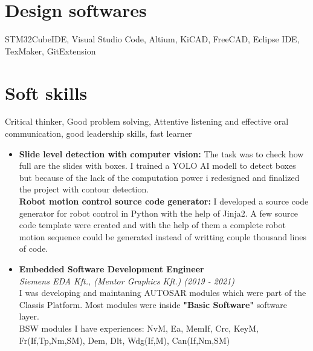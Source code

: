 \documentclass[11pt,oneslide,a4paper,titlepage]{article}
\begin{document}
\newpage
{}
\begin{tcolorbox}
	\begin{minipage}[t]{8cm}
		\vspace*{-0.5cm}
		\begin{tcolorbox}[grow to left by=0.6cm,colback=gray!25,colframe=white]
			\vspace*{0.5cm}
			\section*{Design softwares}
			\hfill\break
			STM32CubeIDE, Visual Studio Code, Altium, KiCAD, FreeCAD, 					Eclipse IDE, TexMaker, GitExtension	
			\section*{Soft skills}
		    Critical thinker, Good problem solving, Attentive listening and effective oral communication, good leadership skills, fast learner				
		\end{tcolorbox}
	\end{minipage}
	\begin{minipage}[t]{11cm}
		\vspace*{0.5cm}
		\begin{tcolorbox}[grow to right by=0.75cm,colframe=white,colback=white]
			\begin{itemize}
			\item[]{
				\textbf{Slide level detection with computer vision:} The task was to check how full are the slides with boxes. I trained a YOLO AI modell to detect boxes but because of the lack of the computation power i redesigned and finalized the project with contour detection. \\ 

				\textbf{Robot motion control source code generator:}
I developed a source code generator for robot control in Python with the help of Jinja2.
A few source code template were created and with the help of them a complete robot motion sequence could be generated instead of writting couple thousand lines of code.
			}
			\end{itemize}
			
			\begin{itemize}
				\item{
					\textbf{Embedded Software Development Engineer} \\
					\emph{Siemens EDA Kft., (Mentor Graphics Kft.) (2019 - 2021)} \\
						\hfill\break
	   				    I was developing and maintaning AUTOSAR modules which were part of the Classis Platform. Most modules were inside \textbf{"Basic Software"} software layer. \\
						\hfill\break
	    				BSW modules I have experiences: NvM, Ea, MemIf, Crc, KeyM, Fr(If,Tp,Nm,SM), Dem, Dlt, Wdg(If,M), Can(If,Nm,SM) \\
	    				
}
\end{itemize}
\end{tcolorbox}
\end{minipage}
\end{tcolorbox}
\end{document}
